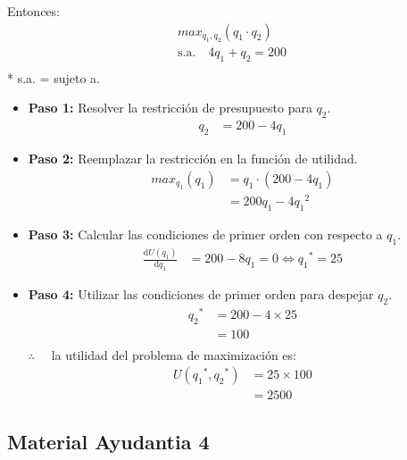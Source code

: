 \documentclass{templateNote}
\begin{document}
Entonces:
\begin{equation*}
    \begin{split}
        max_{q_1, q_2} (q_1 \cdot q_2) \\
        \text{s.a.} \quad 4q_1 + q_2 = 200 \\
    \end{split}
\end{equation*}
* s.a. = sujeto a.\\
\begin{itemize}
    \item \textbf{Paso 1:} Resolver la restricción de presupuesto para $q_2$.
    \begin{align*}
        q_2 &= 200 -4q_1
    \end{align*}
    
    \item \textbf{Paso 2:} Reemplazar la restricción en la función de utilidad.
    \begin{align*}
        max_{q_1} (q_1) &= q_1 \cdot (200 -4q_1) \\
        &= 200q_1 -4 {q_1}^2
    \end{align*}
    
    \item \textbf{Paso 3:} Calcular las condiciones de primer orden con respecto a $q_1$.
    \begin{align*}
        \frac{\mathrm{d} U(q_1)}{\mathrm{d}q_1} &= 200 -8q_1 = 0 \Leftrightarrow {q_1}^* = 25
    \end{align*}
    
    \item \textbf{Paso 4:} Utilizar las condiciones de primer orden para despejar $q_2$.
    \begin{align*}
        {q_2}^* &= 200 -4 \times 25 \\
        &= 100 \\
    \end{align*}
    $\therefore \quad$ la utilidad del problema de maximización es:
    \begin{align*}
        U({q_1}^*, {q_2}^*) &= 25 \times 100 \\
        &= 2500
    \end{align*}
    
\end{itemize}

\newpage
\subsection{Material Ayudantia 4}
\end{document}

